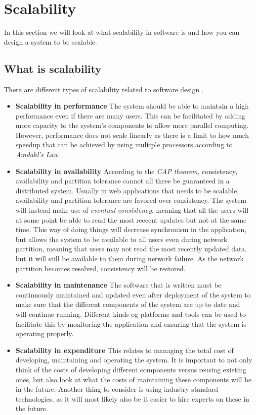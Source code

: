 \section{Scalability}
In this section we will look at what scalability in software is and how you can design a system to be scalable. 

\subsection{What is scalability}
There are different types of scalability related to software design \cite{ScalabilityDesignPrinciples}.
\begin{itemize}
    \item \textbf{Scalability in performance} The system should be able to maintain a high performance even if there are many users. This can be facilitated by adding more capacity to the system's components to allow more parallel computing. However, performance does not scale linearly as there is a limit to how much speedup that can be achieved by using multiple processors according to \textit{Amdahl's Law}. 
    \item \textbf{Scalability in availability} According to the \textit{CAP theorem}, consistency, availability and partition tolerance cannot all three be guaranteed in a distributed system. Usually in web applications that needs to be scalable, availability and partition tolerance are favored over consistency. The system will instead make use of \textit{eventual consistency}, meaning that all the users will at some point be able to read the most reecent updates but not at the same time. This way of doing things will decrease synchronism in the application, but allows the system to be available to all users even during network partition, meaning that users may not read the most recently updated data, but it will still be available to them during network failure. As the network partition becomes resolved, consistency will be restored.
    \item \textbf{Scalability in maintenance} The software that is written must be continuously maintained and updated even after deployment of the system to make sure that the different components of the system are up to date and will continue running. Different kinds og platforms and tools can be used to facilitate this by monitoring the application and ensuring that the system is operating properly. 
    \item \textbf{Scalability in expenditure} This relates to managing the total cost of developing, maintaining and operating the system. It is important to not only think of the costs of developing different components versus reusing existing ones, but also look at what the costs of maintaining these components will be in the future. Another thing to consider is using industry standard technologies, as it will most likely also be it easier to hire experts on these in the future.
\end{itemize}

